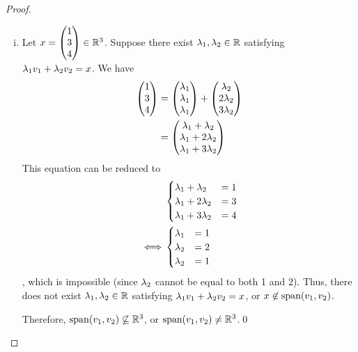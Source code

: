 \begin{proof}
\begin{enumerate}[(i)]
        Conversely, let $x=\ColVecThree{x_1}{x_2}{x_3}\in\R^3$, where $x_1,x_2,x_3\in\R$. Let $\lam_1=x_2-x_3+x_1,\lam_2=\frac{x_3-x_1}{2},\lam_3=\frac{x_1-2x_2+x_3}{2}$. Then,
        \[
            \begin{aligned}
                \lam_1v_1+\lam_2v_2+\lam_3v_3 &= (x_2-x_3+x_1)\ColVecThree{1}{1}{1}+\frac{x_3-x_1}{2}\ColVecThree{1}{2}{3}+\frac{x_1-2x_2+x_3}{2}\ColVecThree{1}{0}{1}\\
                                              &= \ColVecThree{x_2-x_3+x_1+\frac{x_3-x_1}{2}+\frac{x_1+x_3}{2}-x_2}{x_2-x_3+x_1+x_3-x_1}{x_2-x_3+x_1+\frac{3(x_3-x_1)}{2}+\frac{x_1+x_3}{2}-x_2}\\
                                              &= \ColVecThree{x_1}{x_2}{x_3}=x
            \end{aligned}  
        \]
        Thus, $x\in\SpanLA(v_1,v_2,v_3)$, or $\R^3\subseteq\SpanLA(v_1,v_2,v_3)$ (2). Therefore, from (1) and (2), it follows that $\R^3=\SpanLA(v_1,v_2,v_3)$.\qed
        \item Let $x=\begin{pmatrix} 1\\ 3\\ 4\end{pmatrix}\in\mathbb R^3$. Suppose there exist $\lambda_1,\lambda_2\in\mathbb R$ satisfying $\lambda_1v_1+\lambda_2v_2=x$. We have
        \[
            \begin{aligned}
                \begin{pmatrix} 1\\ 3\\ 4\end{pmatrix} &= \begin{pmatrix} \lambda_1\\ \lambda_1\\ \lambda_1\end{pmatrix}+\begin{pmatrix} \lambda_2\\ 2\lambda_2\\ 3\lambda_2\end{pmatrix}\\
                                      &= \begin{pmatrix} \lambda_1+\lambda_2\\ \lambda_1+2\lambda_2\\ \lambda_1+3\lambda_2\end{pmatrix}
            \end{aligned}  
        \]
        This equation can be reduced to
        \begin{align*}
            &\begin{cases}
                \lambda_1+\lambda_2  &= 1\\
                \lambda_1+2\lambda_2 &= 3\\
                \lambda_1+3\lambda_2 &= 4
            \end{cases}\\\iff
            &\begin{cases}
                \lambda_1         &= 1\\
                \lambda_2         &= 2\\
                \lambda_2         &= 1
            \end{cases}
        \end{align*}
        , which is impossible (since $\lambda_2$ cannot be equal to both 1 and 2). Thus, there does not exist $\lambda_1,\lambda_2\in\mathbb R$ satisfying $\lambda_1v_1+\lambda_2v_2=x$, or $x\not\in\textnormal{span}(v_1,v_2)$. 
        
        Therefore, $\textnormal{span}(v_1,v_2)\not\subseteq\mathbb R^3$, or $\textnormal{span}(v_1,v_2)\not=\mathbb R^3$.\qed
    \end{enumerate}
\end{proof}